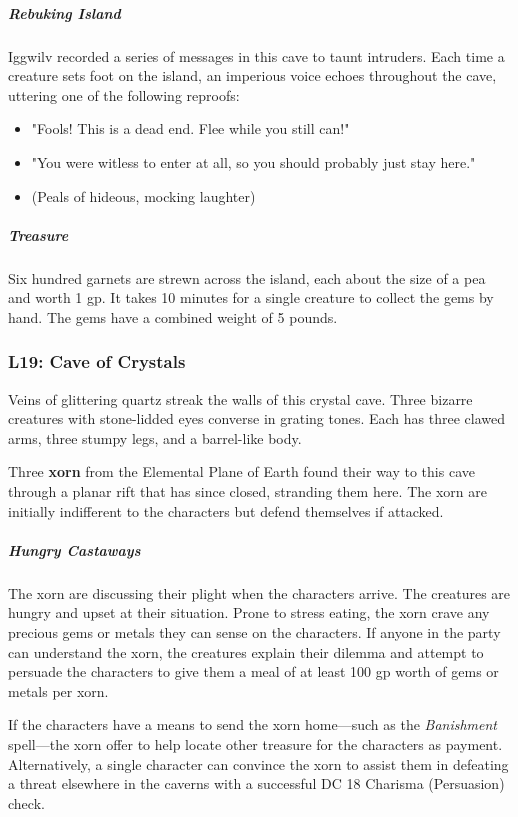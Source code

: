 \documentclass[10pt,a4paper,twoside,bg=print,twocolumn,openany,nodeprecatedcode]{dndbook}
\begin{document}
\subparagraph{Rebuking Island}
Iggwilv recorded a series of messages in this cave to taunt intruders. Each time a creature sets foot on the island, an imperious voice echoes throughout the cave, uttering one of the following reproofs:


\begin{itemize}
\item "Fools! This is a dead end. Flee while you still can!"
\item "You were witless to enter at all, so you should probably just stay here."
\item (Peals of hideous, mocking laughter)
\end{itemize}

\subparagraph{Treasure}
Six hundred garnets are strewn across the island, each about the size of a pea and worth 1 gp. It takes 10 minutes for a single creature to collect the gems by hand. The gems have a combined weight of 5 pounds.

\subsubsection{L19: Cave of Crystals}
\begin{DndReadAloud}{}
Veins of glittering quartz streak the walls of this crystal cave. Three bizarre creatures with stone-lidded eyes converse in grating tones. Each has three clawed arms, three stumpy legs, and a barrel-like body.

\end{DndReadAloud}

Three \textbf{xorn} from the Elemental Plane of Earth found their way to this cave through a planar rift that has since closed, stranding them here. The xorn are initially indifferent to the characters but defend themselves if attacked.

\subparagraph{Hungry Castaways}
The xorn are discussing their plight when the characters arrive. The creatures are hungry and upset at their situation. Prone to stress eating, the xorn crave any precious gems or metals they can sense on the characters. If anyone in the party can understand the xorn, the creatures explain their dilemma and attempt to persuade the characters to give them a meal of at least 100 gp worth of gems or metals per xorn.

If the characters have a means to send the xorn home—such as the \textit{Banishment} spell—the xorn offer to help locate other treasure for the characters as payment. Alternatively, a single character can convince the xorn to assist them in defeating a threat elsewhere in the caverns with a successful DC 18 Charisma (Persuasion) check.
\end{document}
